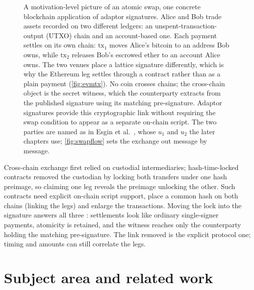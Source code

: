 \begin{figure}[htbp]
  \caption[An atomic swap, in outline]{A motivation-level picture of an atomic
  swap, one concrete blockchain application of adaptor signatures. Alice and Bob trade
  assets recorded on two different ledgers: an unspent-transaction-output (UTXO) chain and
  an account-based one. Each payment settles on its own chain:
  $\mathrm{tx}_1$ moves Alice's bitcoin to an address Bob owns, while $\mathrm{tx}_2$
  releases Bob's escrowed ether to an account Alice owns. The two venues place a lattice
  signature differently, which is why the Ethereum leg settles through a contract rather
  than as a plain payment (\cref{fig:evmtx}). No coin
  crosses chains; the cross-chain object is the secret witness, which the counterparty extracts
  from the published signature using its matching pre-signature. Adaptor signatures provide this cryptographic link
  without requiring the swap condition to appear as a separate on-chain script. The two
  parties are named as in Esgin et al.\ \cite{esgin2020post}, whose $u_1$ and $u_2$ the
  later chapters use; \cref{fig:swapflow} sets the exchange out message by message.}
  \label{fig:swapidea}
\end{figure}

Cross-chain exchange first relied on custodial intermediaries; hash-time-locked contracts
removed the custodian by locking both transfers under one hash preimage, so claiming one
leg reveals the preimage unlocking the other. Such contracts need explicit
on-chain script support, place a common hash on both chains (linking the legs) and
enlarge the transactions. Moving the lock into the signature answers all three
\cite{poelstra2017,aumayr2021generalized}: settlements look like ordinary single-signer
payments, atomicity is retained, and the witness reaches only the counterparty holding
the matching pre-signature. The link removed is the explicit protocol one; timing and
amounts can still correlate the legs.

\section{Subject area and related work}
\label{sec:relatedwork}

